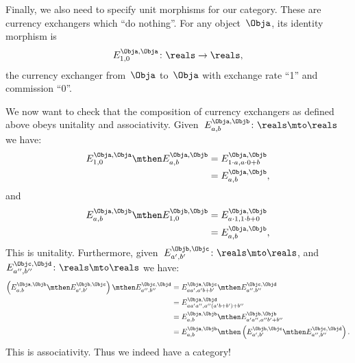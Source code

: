 Finally, we also need to specify unit morphisms for our category.
These are currency exchangers which ``do nothing''.
For any object~$\Obja$, its identity morphism is
\begin{equation*}
    E_{1,0}^{\Obja,\Obja} \colon \reals \to \reals,
\end{equation*}
the currency exchanger from~$\Obja$ to~$\Obja$ with exchange rate ``1'' and commission ``0''.

We now want to check that the composition of currency exchangers as defined above obeys unitality and associativity.
Given~$E_{a,b}^{\Obja,\Objb}\colon \reals \mto \reals$ we have:
\begin{equation*}
    \begin{aligned}
        E_{1,0}^{\Obja,\Obja}\mthen E_{a,b}^{\Obja,\Objb} & =E_{1\cdot a, a\cdot 0+b}^{\Obja,\Objb} \\
                                                          & =E_{a,b}^{\Obja,\Objb},
    \end{aligned}
\end{equation*}
and
\begin{equation*}
    \begin{aligned}
        E_{a,b}^{\Obja,\Objb}\mthen E_{1,0}^{\Objb,\Objb} & =E_{a\cdot 1, 1\cdot b+0}^{\Obja,\Objb} \\
                                                          & =E_{a,b}^{\Obja,\Objb},
    \end{aligned}
\end{equation*}
This is unitality.
Furthermore, given~$E_{a',b'}^{\Objb,\Objc}\colon \reals \mto \reals$, and~$E_{a'',b''}^{\Objc,\Objd}\colon \reals \mto \reals$ we have:
\begin{equation*}
    \begin{aligned}
        \left( E_{a,b}^{\Obja,\Objb}\mthen E_{a',b'}^{\Objb,\Objc}\right)\mthen E_{a'',b''}^{\Objc,\Objd} & =E_{aa',a'b+b'}^{\Obja,\Objc}\mthen E_{a'',b''}^{\Objc,\Objd}                                       \\
                                                                                                          & =E_{aa'a'',a''(a'b+b')+b''}^{\Obja,\Objd}                                                           \\
                                                                                                          & =E_{a,b}^{\Obja,\Objb}\mthen E_{a'a'',a''b'+b''}^{\Objb,\Objb}                                      \\
                                                                                                          & =E_{a,b}^{\Obja,\Objb}\mthen \left( E_{a',b'}^{\Objb,\Objc}\mthen E_{a'',b''}^{\Objc,\Objd}\right).
    \end{aligned}
\end{equation*}
This is associativity.
Thus we indeed have a category!

